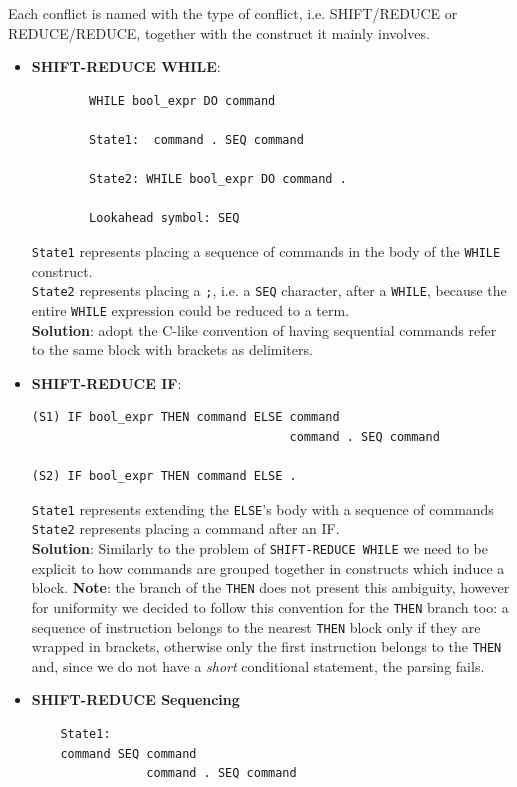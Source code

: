 \documentclass[a4paper,11pt]{report}
\begin{document}
Each conflict is named with the type of conflict, i.e. SHIFT/REDUCE or REDUCE/REDUCE, together with the construct it mainly involves.
\begin{itemize}
    \item \textbf{SHIFT-REDUCE WHILE}: 
    \begin{lstlisting}
        WHILE bool_expr DO command

        State1:  command . SEQ command

        State2: WHILE bool_expr DO command .
    
        Lookahead symbol: SEQ
    \end{lstlisting}
\verb|State1| represents placing a sequence of commands in the body of the \verb|WHILE| construct.\\
\verb|State2| represents placing a \verb|;|, i.e. a \verb|SEQ| character, after a \verb|WHILE|, because the entire \verb|WHILE| expression could be reduced to a term.\\
\textbf{Solution}: adopt the C-like convention of having sequential commands refer to the same block with brackets as delimiters.

    \item \textbf{SHIFT-REDUCE IF}:
    \begin{lstlisting}
(S1) IF bool_expr THEN command ELSE command
                                    command . SEQ command

(S2) IF bool_expr THEN command ELSE .
    \end{lstlisting}
    \verb|State1| represents extending the \verb|ELSE|'s body with a sequence of commands\\
    \verb|State2| represents placing a command after an IF.\\
    \textbf{Solution}: 
    Similarly to the problem of \verb|SHIFT-REDUCE WHILE| we need to be explicit to how commands are grouped together in constructs which induce a block. \textbf{Note}: the branch of the \verb|THEN| does not present this ambiguity, however for uniformity we decided to follow this convention for the \verb|THEN| branch too: a sequence of instruction belongs to the nearest \verb|THEN| block only if they are wrapped in brackets, otherwise only the first instruction belongs to the \verb|THEN| and, since we do not have a \textit{short} conditional statement, the parsing fails. 
    
    \item \textbf{SHIFT-REDUCE Sequencing}
    
    \begin{lstlisting}
    State1:
    command SEQ command 
                command . SEQ command 


\end{lstlisting}
\end{itemize}
\end{document}
